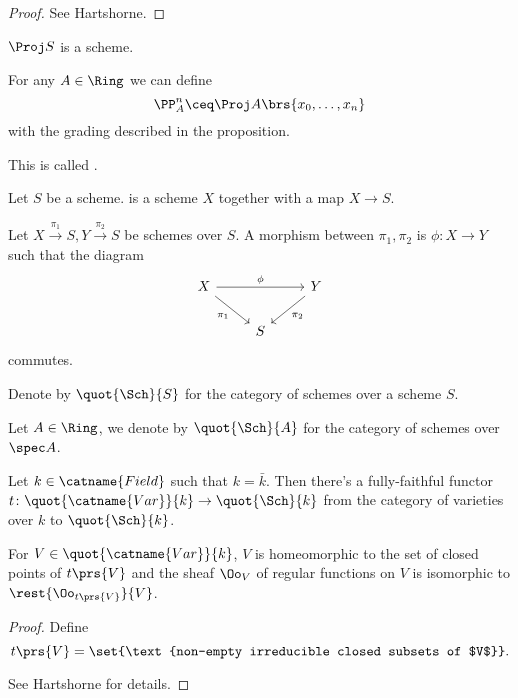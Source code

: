 \documentclass[10pt,a4paper,twoside,openany,hidelinks]{book}
\begin{document}
\begin{proof}
See Hartshorne.
\end{proof}

\begin{corollary}
$\Proj S$ is a scheme.
\end{corollary}

\begin{definition}
For any $A \in \Ring$ we can define
\[\PP_A^n \ceq \Proj A\brs{x_0, \ldots, x_n}\]
with the grading described in the proposition.

This is called .
\end{definition}

\begin{definition}
Let $S$ be a scheme.  is a scheme $X$ together with a map $X \to S$.
\end{definition}

\begin{definition}[]
Let $X \xrightarrow{\pi_1} S, Y \xrightarrow{\pi_2} S$ be schemes over $S$.
A morphism between $\pi_1, \pi_2$ is $\phi \colon X \to Y$ such that
the diagram
\[
\begin{tikzcd}
X \arrow[rr, "\phi"] \arrow[dr, "\pi_1", swap] & & Y \arrow[dl, "\pi_2"] \\
& S & 
\end{tikzcd}
\]
commutes.
\end{definition}

\begin{notation}
Denote by $\quot{\Sch}{S}$ for the category of schemes over a scheme $S$.

Let $A \in \Ring$, we denote by $\quot{\Sch}{A}$ for the category of schemes over $\spec A$.
\end{notation}

\begin{proposition}
Let $k \in \catname{Field}$ such that $k = \bar{k}$. Then there's a fully-faithful functor $t \colon \quot{\catname{Var}}{k} \to \quot{\Sch}{k}$ from the category of varieties over $k$ to $\quot{\Sch}{k}$.

For $V \in \quot{\catname{Var}}{k}$, $V$ is homeomorphic to the set of closed points of $t\prs{V}$ and the sheaf $\Oo_V$ of regular functions on $V$ is isomorphic to $\rest{\Oo_{t\prs{V}}}{V}$.
\end{proposition}

\begin{proof}
Define
\[t\prs{V} = \set{\text{non-empty irreducible closed subsets of $V$}} \text{.}\]

See Hartshorne for details.
\end{proof}
\end{document}
